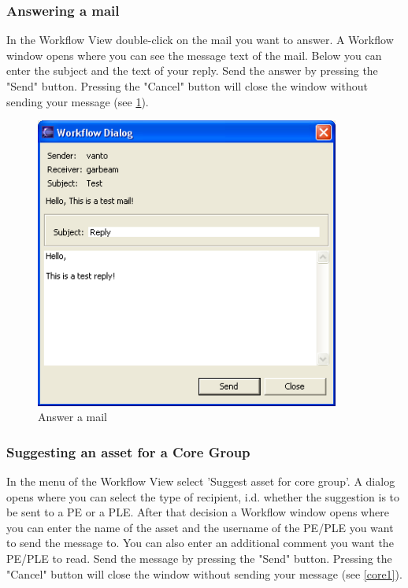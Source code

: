 \subsubsection{Answering a mail}

In the Workflow View double-click on the mail you want to answer. A Workflow
window opens where you can see the message text of the mail. Below you can enter
the subject and the text of your reply. Send the answer by pressing the "Send" 
button. Pressing the "Cancel" button will close the window without sending 
your message (see \ref{answermail}).

\begin{figure}[h!]
\begin{center}
\includegraphics[width=10cm]{answermail.png}
   \caption{Answer a mail}
\label{answermail}
\end{center}
\end{figure}\par

\subsubsection{Suggesting an asset for a Core Group}

In the menu of the Workflow View select 'Suggest asset for core group'. A dialog opens where
 you can select the type of recipient, i.d. whether the suggestion is to be sent to a PE or a PLE. After
 that decision a Workflow
window opens where you can enter the name of the asset and the username of the
PE/PLE you want to send the message to. You can also enter an additional comment you want 
the PE/PLE to read. Send the message by pressing the "Send" 
button. Pressing the "Cancel" button will close the window without sending 
your message (see \ref{core1}).


